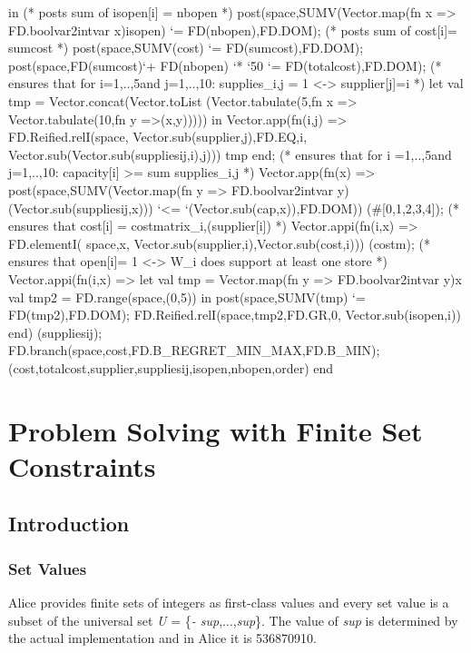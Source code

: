 \documentclass[a4paper]{scrartcl}
\begin{document}
\begin{myverbatim}
    in  
      (* posts sum of isopen[i] = nbopen *) 
       post(space,SUMV(Vector.map(fn x => 
              FD.boolvar2intvar x)isopen) `= FD(nbopen),FD.DOM);
      (* posts sum of cost[i]= sumcost *)
       post(space,SUMV(cost) `= FD(sumcost),FD.DOM);
       post(space,FD(sumcost)`+ FD(nbopen) `* `50 
                    `= FD(totalcost),FD.DOM);
      (* ensures that for i={1,..,5}and j={1,..,10}: 
         supplies_{i,j} = 1 <-> supplier[j]=i *)
       let  
          val tmp = Vector.concat(Vector.toList
               (Vector.tabulate(5,fn x => 
                        Vector.tabulate(10,fn y =>(x,y)))))
       in
          Vector.app(fn(i,j) =>
               FD.Reified.relI(space,
                  Vector.sub(supplier,j),FD.EQ,i,
                  Vector.sub(Vector.sub(suppliesij,i),j)))
                    tmp
       end;
      (* ensures that for i ={1,..,5}and j={1,..,10}: 
         capacity[i] >= sum supplies_{i,j} *)
       Vector.app(fn(x) => 
          post(space,SUMV(Vector.map(fn y =>
                 FD.boolvar2intvar y)(Vector.sub(suppliesij,x))) 
                 `<= `(Vector.sub(cap,x)),FD.DOM))
                 (#[0,1,2,3,4]); 
      (* ensures that cost[i] = costmatrix_{i,(supplier[i])} *)           
       Vector.appi(fn(i,x) => FD.elementI( space,x,
                  Vector.sub(supplier,i),Vector.sub(cost,i)))
                  (costm);
      (* ensures that open[i]= 1 <-> 
         W_i does support at least one store *)   
       Vector.appi(fn(i,x) => 
         let
            val tmp = Vector.map(fn y => FD.boolvar2intvar y)x
            val tmp2 =  FD.range(space,(0,5))                  
         in
            post(space,SUMV(tmp) `= FD(tmp2),FD.DOM);
            FD.Reified.relI(space,tmp2,FD.GR,0, Vector.sub(isopen,i))
         end)  
           (suppliesij);
       FD.branch(space,cost,FD.B_REGRET_MIN_MAX,FD.B_MIN);
     ({cost,totalcost,supplier,suppliesij,isopen,nbopen},order)
   end

\end{myverbatim}




\newpage
\section{Problem Solving with Finite Set Constraints}
\subsection{Introduction}
\subsubsection{Set Values}
Alice provides finite sets of integers as 
first-class values and every set value is a subset of 
the universal set {\it U} = \{{\it - sup},$\ldots$,{\it sup}\}. 
The value of {\it sup} is determined by the 
actual implementation and in Alice it is 536870910.
\end{document}
